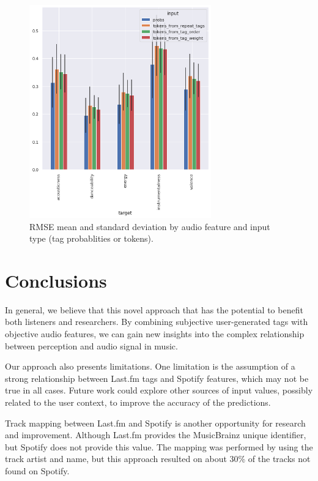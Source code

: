 \documentclass[sn-mathphys]{sn-jnl}%
\theoremstyle{thmstyleone}%
\theoremstyle{thmstyletwo}%
\theoremstyle{thmstylethree}%
\begin{document}
\begin{figure}[h!]
      \centering
      \includegraphics[width=0.7\textwidth]{images/rmse_by_feature_and_input.png}
      \caption{RMSE mean and standard deviation by audio feature and input type (tag probablities or tokens).}
      \label{fig:rmse_by_feature_and_input}
\end{figure}

\section{Conclusions}

In general, we believe that this novel approach that has the potential to benefit both listeners and researchers.
By combining subjective user-generated tags with objective audio features,
we can gain new insights into the complex relationship between perception and audio signal in music.

Our approach also presents limitations.
One limitation is the assumption of a strong relationship between Last.fm tags and Spotify features, which may not be true in all cases.
Future work could explore other sources of input values, possibly related to the user context, to improve the accuracy of the predictions.

Track mapping between Last.fm and Spotify is another opportunity for research and improvement.
Although Last.fm provides the MusicBrainz unique identifier, but Spotify does not provide this value.
The mapping was performed by using the track artist and name, but this approach resulted on about 30\% of the tracks not found on Spotify.
\end{document}
